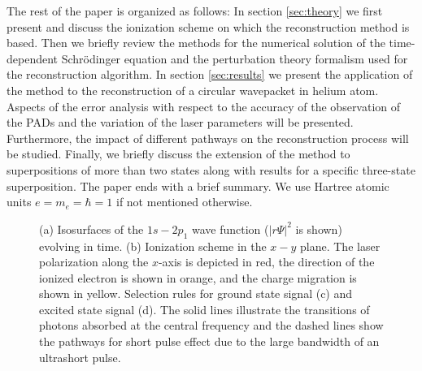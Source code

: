 The rest of the paper is organized as follows: In section \ref{sec:theory} we first present and discuss the ionization scheme on which the reconstruction method is based. Then we briefly review the methods for the numerical solution of the time-dependent Schr\"odinger equation and the perturbation theory formalism used for the reconstruction algorithm. In section \ref{sec:results} we present the application of the method to the reconstruction of a circular wavepacket in helium atom. Aspects of the error analysis with respect to the accuracy of the observation of the PADs and the variation of the laser parameters will be presented. Furthermore, the impact of different pathways on the reconstruction process will be studied. Finally, we briefly discuss the extension of the method to superpositions of more than two states along with results for a specific three-state superposition. The paper ends with a brief summary. We use Hartree atomic units $e = m_e = \hbar =1$ if not mentioned otherwise.


\begin{figure}[t]
\centering
\caption{(a) Isosurfaces of the $1s-2p_1$ wave function ($|r\Psi|^2$ is shown) evolving in time. (b) Ionization scheme in the $x-y$ plane. The laser polarization along the $x$-axis is depicted in red, the direction of the ionized electron is shown in orange, and the charge migration is shown in yellow. Selection rules for ground state signal (c) and excited state signal (d). The solid lines illustrate the transitions of photons absorbed at the central frequency and the dashed lines show the pathways for short pulse effect due to the large bandwidth of an ultrashort pulse.
} 
  \label{fig:dynamic_visualization}
\end{figure}

